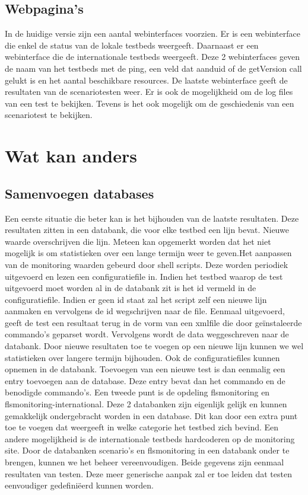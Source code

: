 \subsection{Webpagina\rq s}
\npar
In de huidige versie zijn een aantal webinterfaces voorzien. 
Er is een webinterface die enkel de status van de lokale testbeds weergeeft. Daarnaast er een webinterface die de internationale testbeds weergeeft. 
Deze 2 webinterfaces geven de naam van het testbeds met de ping, een veld dat aanduid of de getVersion call gelukt is en het aantal beschikbare resources.
\npar
De laatste webinterface geeft de resultaten van de scenariotesten weer. Er is ook de mogelijkheid om de log files van een test te bekijken. Tevens is het ook mogelijk om de geschiedenis van een scenariotest te bekijken.
\section{Wat kan anders}
\subsection{Samenvoegen databases}
\npar
Een eerste situatie die beter kan is het bijhouden van de laatste resultaten.
Deze resultaten zitten in een databank, die voor elke testbed een lijn bevat. Nieuwe waarde overschrijven die lijn. Meteen kan opgemerkt worden dat het niet mogelijk is om statistieken over een lange termijn weer te geven.Het aanpassen van de monitoring waarden gebeurd door shell scripts. Deze worden periodiek uitgevoerd en lezen een configuratiefile in. Indien het testbed waarop de test uitgevoerd moet worden al in de databank zit is het id vermeld in de configuratiefile. Indien er geen id staat zal het script zelf een nieuwe lijn aanmaken en vervolgens de id wegschrijven naar de file. Eenmaal uitgevoerd, geeft de test een resultaat terug in de vorm van een xmlfile die door ge\"instaleerde commando\rq s geparset wordt. Vervolgens wordt de data weggeschreven naar de databank.
\npar
Door nieuwe resultaten toe te voegen op een nieuwe lijn kunnen we wel statistieken over langere termijn bijhouden.
Ook de configuratiefiles kunnen opnemen in de databank. Toevoegen van een nieuwe test is dan eenmalig een entry toevoegen aan de database.
Deze entry bevat dan het commando en de benodigde commando's.
\npar
Een tweede punt is de opdeling flsmonitoring en flsmonitoring-international. Deze 2 databanken zijn eigenlijk gelijk en kunnen gemakkelijk ondergebracht worden in een database.
Dit kan door een extra punt toe te voegen dat weergeeft in welke categorie het testbed zich bevind. Een andere mogelijkheid is de internationale testbeds hardcoderen op de monitoring site.
\npar
Door de databanken scenario\rq s en flsmonitoring in een databank onder te brengen, kunnen we het beheer vereenvoudigen.
Beide gegevens zijn eenmaal resultaten van testen. Deze meer generische aanpak zal er toe leiden dat testen eenvoudiger gedefini\"eerd kunnen worden.
